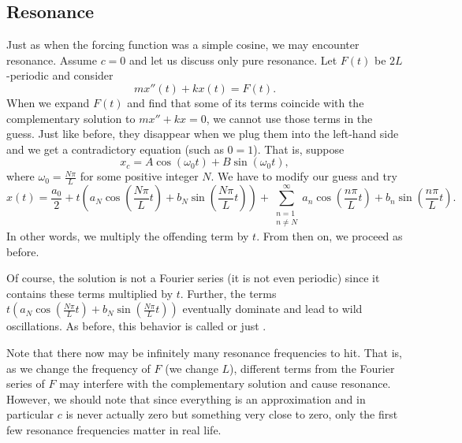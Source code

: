\documentclass{ximera}
\begin{document}
\subsection{Resonance}

Just as when the forcing function was a simple cosine, we may encounter resonance.  Assume $c=0$ and let us discuss only pure resonance. Let $F(t)$ be $2L$-periodic and consider
\begin{equation*}
    m x''(t) + k x (t) = F(t) .
\end{equation*}
When we expand $F(t)$ and find that some of its terms coincide with the complementary solution to $mx''+kx=0$, we cannot use those terms in the guess.  Just like before, they disappear when we plug them into the left-hand side and we get a contradictory equation (such as $0=1$).   That is, suppose
\begin{equation*}
    x_c = A \cos (\omega_0 t) + B \sin (\omega_0 t), 
\end{equation*}
where $\omega_0 = \frac{N \pi}{L}$ for some positive integer $N$. We have to modify our guess and try
\begin{equation*}
    x(t) = \frac{a_0}{2} + t \left( a_N \cos \left( \frac{N \pi}{L} t \right) + b_N \sin \left( \frac{N \pi}{L} t \right) \right) +
    \sum_{\substack{n=1\\n\not= N}}^\infty a_n \cos \left( \frac{n \pi}{L} t \right) + b_n \sin \left( \frac{n \pi}{L} t \right) .
\end{equation*}
In other words, we multiply the offending term by $t$.  From then on, we proceed as before.

Of course, the solution is not a Fourier series (it is not even periodic) since it contains these terms multiplied by $t$.  Further, the terms
$t \left( a_N \cos \left( \frac{N \pi}{L} t \right) + b_N \sin \left( \frac{N \pi}{L} t \right) \right)$ 
eventually dominate and lead to wild oscillations.  As before, this behavior is called \emph{} or just \emph{}.

Note that there now may be infinitely many resonance frequencies to hit. That is, as we change the frequency of $F$ (we change $L$), different terms from the Fourier series of $F$ may interfere with the complementary solution and cause resonance. However, we should note that since everything is an approximation and in particular $c$ is never actually zero but something very close to zero, only the first few resonance frequencies matter in real life.
\end{document}
